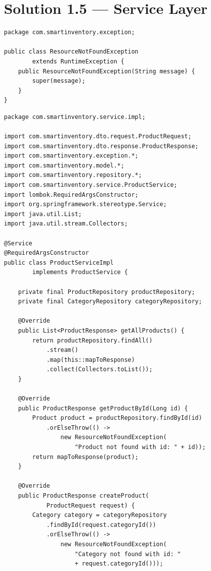 \documentclass[12pt,a4paper]{report}
\begin{document}
\section{Solution 1.5 --- Service Layer}

\begin{lstlisting}[style=javastyle, title={exception/ResourceNotFoundException.java}]
package com.smartinventory.exception;

public class ResourceNotFoundException
        extends RuntimeException {
    public ResourceNotFoundException(String message) {
        super(message);
    }
}
\end{lstlisting}

\begin{lstlisting}[style=javastyle, title={service/impl/ProductServiceImpl.java}]
package com.smartinventory.service.impl;

import com.smartinventory.dto.request.ProductRequest;
import com.smartinventory.dto.response.ProductResponse;
import com.smartinventory.exception.*;
import com.smartinventory.model.*;
import com.smartinventory.repository.*;
import com.smartinventory.service.ProductService;
import lombok.RequiredArgsConstructor;
import org.springframework.stereotype.Service;
import java.util.List;
import java.util.stream.Collectors;

@Service
@RequiredArgsConstructor
public class ProductServiceImpl
        implements ProductService {

    private final ProductRepository productRepository;
    private final CategoryRepository categoryRepository;

    @Override
    public List<ProductResponse> getAllProducts() {
        return productRepository.findAll()
            .stream()
            .map(this::mapToResponse)
            .collect(Collectors.toList());
    }

    @Override
    public ProductResponse getProductById(Long id) {
        Product product = productRepository.findById(id)
            .orElseThrow(() ->
                new ResourceNotFoundException(
                    "Product not found with id: " + id));
        return mapToResponse(product);
    }

    @Override
    public ProductResponse createProduct(
            ProductRequest request) {
        Category category = categoryRepository
            .findById(request.categoryId())
            .orElseThrow(() ->
                new ResourceNotFoundException(
                    "Category not found with id: "
                    + request.categoryId()));


\end{lstlisting}
\end{document}
